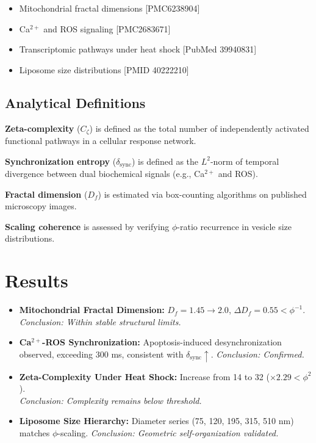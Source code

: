\documentclass[12pt]{article}
\begin{document}
\begin{itemize}
\item Mitochondrial fractal dimensions [PMC6238904]
\item Ca$^{2+}$ and ROS signaling [PMC2683671]
\item Transcriptomic pathways under heat shock [PubMed 39940831]
\item Liposome size distributions [PMID 40222210]
\end{itemize}

\subsection*{Analytical Definitions}

\textbf{Zeta-complexity} ($C_{\zeta}$) is defined as the total number of independently activated functional pathways in a cellular response network.

\textbf{Synchronization entropy} ($\delta_{\mathrm{sync}}$) is defined as the $L^2$-norm of temporal divergence between dual biochemical signals (e.g., Ca$^{2+}$ and ROS).

\textbf{Fractal dimension} ($D_f$) is estimated via box-counting algorithms on published microscopy images.

\textbf{Scaling coherence} is assessed by verifying $\phi$-ratio recurrence in vesicle size distributions.

\section{Results}

\begin{itemize}
\item \textbf{Mitochondrial Fractal Dimension:} $D_f = 1.45 \to 2.0$, $\Delta D_f = 0.55 < \phi^{-1}$. \\
\textit{Conclusion: Within stable structural limits.}

\item \textbf{Ca$^{2+}$-ROS Synchronization:} Apoptosis-induced desynchronization observed, exceeding 300 ms, consistent with $\delta_{\mathrm{sync}} \uparrow$. \textit{Conclusion: Confirmed.}

\item \textbf{Zeta-Complexity Under Heat Shock:} Increase from 14 to 32 ($\times 2.29 < \phi^2$). \\
\textit{Conclusion: Complexity remains below threshold.}

\item \textbf{Liposome Size Hierarchy:} Diameter series (75, 120, 195, 315, 510 nm) matches $\phi$-scaling. \textit{Conclusion: Geometric self-organization validated.}
\end{itemize}
\end{document}
